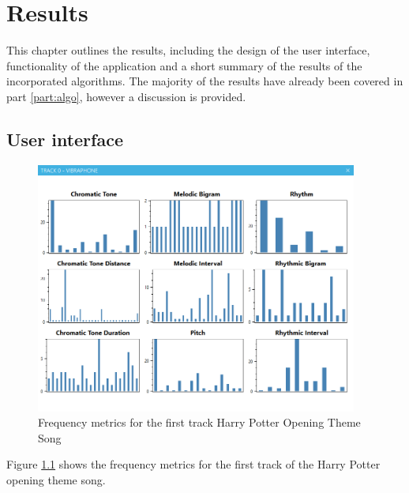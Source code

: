 

\chapter{Results}
This chapter outlines the results, including the design of the user interface, functionality of the application and a short summary of the results of the incorporated algorithms.
The majority of the results have already been covered in part \ref{part:algo}, however a discussion is provided.

\section{User interface}

\begin{figure}
\centerline{\includegraphics[width=400px]{../images/res_ui_metrics_harry_t0.png}}
\caption{Frequency metrics for the first track Harry Potter Opening Theme Song}
\label{ims:metricsharryt0}
\end{figure}

Figure \ref{ims:metricsharryt0} shows the frequency metrics for the first track of the Harry Potter opening theme song.

